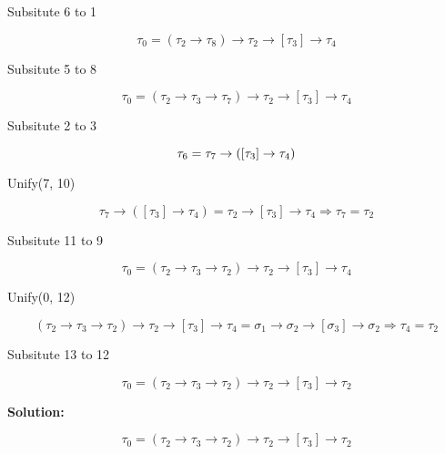 \documentclass{article}
\begin{document}
\begin{center} Subsitute 6 to 1\end{center}
\begin{equation}  
	\tau_0 = (\tau_2 \rightarrow \tau_8) \rightarrow \tau_2 \rightarrow [\tau_3]
	\rightarrow \tau_4
\end{equation}

\begin{center} Subsitute 5 to 8\end{center}
\begin{equation}  
	\tau_0 = (\tau_2 \rightarrow \tau_3 \rightarrow \tau_7) \rightarrow \tau_2
	\rightarrow [\tau_3] \rightarrow \tau_4
\end{equation}

\begin{center} Subsitute 2 to 3\end{center}
\begin{equation}  
	\tau_6 = \tau_7 \rightarrow ([\tau_3] \rightarrow \tau_4)\\
\end{equation}

\begin{center} Unify(7, 10) \end{center}
\begin{equation}  
\tau_7 \rightarrow ([\tau_3] \rightarrow \tau_4) = \tau_2 \rightarrow [\tau_3]
\rightarrow \tau_4  \Rightarrow \tau_7 = \tau_2
\end{equation}

\begin{center} Subsitute 11 to 9\end{center}
\begin{equation}  
\tau_0 = (\tau_2 \rightarrow \tau_3 \rightarrow \tau_2) \rightarrow \tau_2
	\rightarrow [\tau_3] \rightarrow \tau_4
\end{equation}

\begin{center} Unify(0, 12) \end{center}
\begin{equation}  
(\tau_2 \rightarrow \tau_3 \rightarrow \tau_2) \rightarrow \tau_2
	\rightarrow [\tau_3] \rightarrow \tau_4 = \sigma_1 \rightarrow \sigma_2
	\rightarrow [\sigma_3] \rightarrow \sigma_2 \Rightarrow \tau_4 = \tau_2
\end{equation}

\begin{center} Subsitute 13 to 12\end{center}
\begin{equation}  
\tau_0 = (\tau_2 \rightarrow \tau_3 \rightarrow \tau_2) \rightarrow \tau_2
	\rightarrow [\tau_3] \rightarrow \tau_2
\end{equation}

\begin{center} \textbf{Solution: }\end{center}
\begin{equation*}  
\tau_0 = (\tau_2 \rightarrow \tau_3 \rightarrow \tau_2) \rightarrow \tau_2
	\rightarrow [\tau_3] \rightarrow \tau_2
\end{equation*}  
\end{document}
